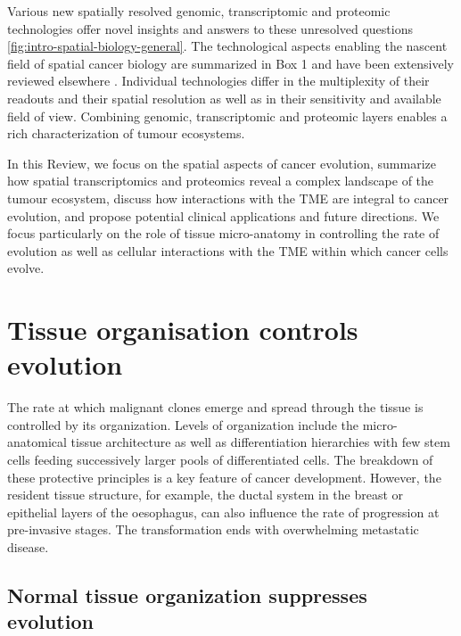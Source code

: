 Various new spatially resolved genomic, transcriptomic and proteomic technologies offer novel insights and answers to these unresolved questions \cref{fig:intro-spatial-biology-general}. The technological aspects enabling the nascent field of spatial cancer biology are summarized in Box 1 and have been extensively reviewed elsewhere \parencite{Lewis2021-ic}. Individual technologies differ in the multiplexity of their readouts and their spatial resolution as well as in their sensitivity and available field of view. Combining genomic, transcriptomic and proteomic layers enables a rich characterization of tumour ecosystems.

In this Review, we focus on the spatial aspects of cancer evolution, summarize how spatial transcriptomics and proteomics reveal a complex landscape of the tumour ecosystem, discuss how interactions with the \ac{TME} are integral to cancer evolution, and propose potential clinical applications and future directions. We focus particularly on the role of tissue micro-anatomy in controlling the rate of evolution as well as cellular interactions with the \ac{TME} within which cancer cells evolve.

\section{Tissue organisation controls evolution}

The rate at which malignant clones emerge and spread through the tissue is controlled by its organization. Levels of organization include the micro-anatomical tissue architecture as well as differentiation hierarchies with few stem cells feeding successively larger pools of differentiated cells. The breakdown of these protective principles is a key feature of cancer development. However, the resident tissue structure, for example, the ductal system in the breast or epithelial layers of the oesophagus, can also influence the rate of progression at pre-invasive stages. The transformation ends with overwhelming metastatic disease.

\subsection*{Normal tissue organization suppresses evolution}

